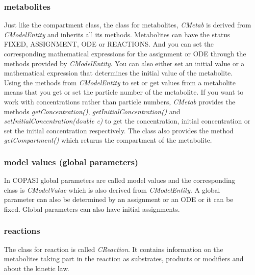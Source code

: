 \documentclass[a4,10pt]{article}
\begin{document}
\subsubsection{metabolites}
Just like the compartment class, the class for metabolites, \textit{CMetab} is derived from \textit{CModelEntity} and inherits all its methods.
Metabolites can have the status FIXED, ASSIGNMENT, ODE or REACTIONS. And you can set the corresponding mathematical expressions for the assignment or ODE through the methods provided by \textit{CModelEntity}. You can also either set an initial value or a mathematical expression that determines the initial value of the metabolite. Using the methods from \textit{CModelEntity} to set or get values from a metabolite means that you get or set the particle number of the metabolite. If you want to work with concentrations rather than particle numbers, \textit{CMetab} provides the methods \textit{getConcentration()}, \textit{getInitialConcentration()} and \textit{setInitialConcentration(double c)} to get the concentration, initial concentration or set the initial concentration respectively. The class also provides the method \textit{getCompartment()} which returns the compartment of the metabolite.

\subsubsection{model values (global parameters)}
In COPASI global parameters are called model values and the corresponding class is \textit{CModelValue} which is also derived from \textit{CModelEntity}. A global parameter can also be determined by an assignment or an ODE or it can be fixed. Global parameters can also have initial assignments.

\subsubsection{reactions}
The class for reaction is called \textit{CReaction}. It contains information on the metabolites taking part in the reaction as substrates, products or modifiers and about the kinetic law.
\end{document}
